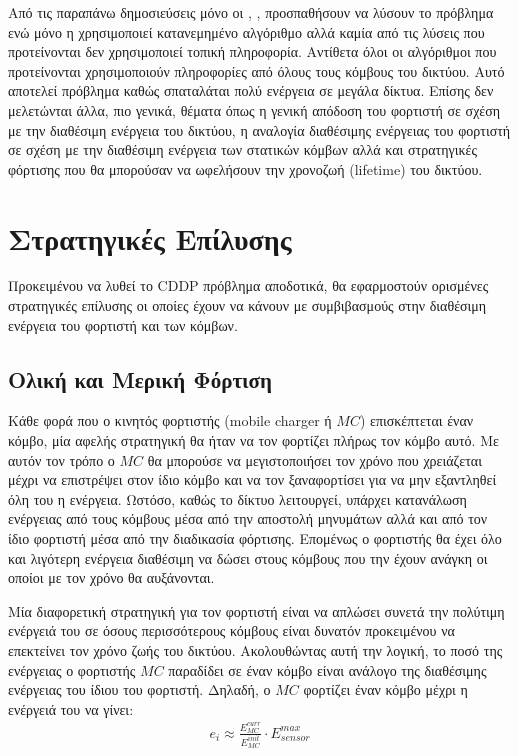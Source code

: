 Από τις παραπάνω δημοσιεύσεις μόνο οι \cite{prolonging_j-roc}, \cite{j-roc}, \cite{yuanyuan_joint} \cite{immortal_wsns} προσπαθήσουν να
λύσουν το πρόβλημα ενώ μόνο η \cite{yuanyuan_joint} χρησιμοποιεί κατανεμημένο αλγόριθμο αλλά  καμία από τις λύσεις που προτείνονται δεν χρησιμοποιεί τοπική
πληροφορία. Αντίθετα όλοι οι αλγόριθμοι που προτείνονται χρησιμοποιούν πληροφορίες από όλους τους κόμβους του δικτύου. Αυτό αποτελεί πρόβλημα καθώς σπαταλάται πολύ
ενέργεια σε μεγάλα δίκτυα. Επίσης δεν μελετώνται άλλα, πιο γενικά, θέματα όπως η γενική απόδοση του φορτιστή σε σχέση με την διαθέσιμη ενέργεια του δικτύου, η
αναλογία διαθέσιμης ενέργειας του φορτιστή σε σχέση με την διαθέσιμη ενέργεια των στατικών κόμβων αλλά και στρατηγικές φόρτισης που θα μπορούσαν να ωφελήσουν την
χρονοζωή (lifetime) του δικτύου.

\section{Στρατηγικές Επίλυσης}
Προκειμένου να λυθεί το CDDP πρόβλημα αποδοτικά, θα εφαρμοστούν ορισμένες στρατηγικές επίλυσης οι οποίες έχουν να κάνουν με συμβιβασμούς στην διαθέσιμη ενέργεια του
φορτιστή και των κόμβων.

\subsection{Ολική και Μερική Φόρτιση}
Κάθε φορά που ο κινητός φορτιστής (mobile charger ή $MC$) επισκέπτεται έναν κόμβο, μία αφελής στρατηγική θα ήταν να τον φορτίζει πλήρως τον κόμβο αυτό. Με αυτόν τον
τρόπο ο $MC$ θα μπορούσε να μεγιστοποιήσει τον χρόνο που χρειάζεται μέχρι να επιστρέψει στον ίδιο κόμβο και να τον ξαναφορτίσει για να μην εξαντληθεί όλη του η
ενέργεια. Ωστόσο, καθώς το δίκτυο λειτουργεί, υπάρχει κατανάλωση ενέργειας από τους κόμβους μέσα από την αποστολή μηνυμάτων αλλά και από τον ίδιο φορτιστή μέσα από
την διαδικασία φόρτισης. Επομένως ο φορτιστής θα έχει όλο και λιγότερη ενέργεια διαθέσιμη να δώσει στους κόμβους που την έχουν ανάγκη οι οποίοι με τον χρόνο θα
αυξάνονται.

Μία διαφορετική στρατηγική για τον φορτιστή είναι να απλώσει συνετά την πολύτιμη ενέργειά του σε όσους περισσότερους κόμβους είναι δυνατόν προκειμένου να επεκτείνει
τον χρόνο ζωής του δικτύου. Ακολουθώντας αυτή την λογική, το ποσό της ενέργειας ο φορτιστής $MC$ παραδίδει σε έναν κόμβο είναι ανάλογο της διαθέσιμης ενέργειας του
ίδιου του φορτιστή. Δηλαδή, ο $MC$ φορτίζει έναν κόμβο μέχρι η ενέργειά του να γίνει:
\begin{align*}
e_{i} \approx \frac{E^{curr}_{MC}}{E^{init}_{MC}}\cdot E^{max}_{sensor}
\end{align*}

